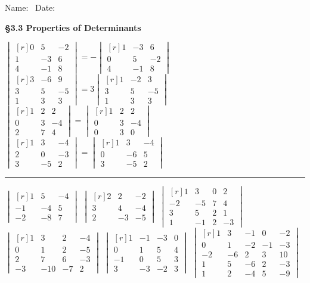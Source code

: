 \documentclass[11pt,answers]{exam} %
\newcommand{\dett}[1]{\begin{vmatrix*}[r] #1 \end{vmatrix*}}
\begin{document}
\flushleft
Name:\ \makebox[4in]{\hrulefill} \hspace{1in} Date:\ \makebox[1in]{\hrulefill}
\begin{center}
    \textbf{\S 3.3 Properties of Determinants}
\end{center}


\begin{questions}
    \question $\dett{0 & 5 & -2 \\ 1 & -3 & 6 \\ 4 & -1 & 8} = -\dett{1 & -3 & 6  \\ 0 & 5 & -2 \\ 4 & -1 & 8}$
    \question $\dett{3 & -6 & 9 \\ 3 & 5 & -5 \\ 1 & 3 & 3} = 3 \dett{1 & -2 & 3 \\ 3 & 5 & -5 \\ 1 & 3 & 3}$
    \question $\dett{1 & 2 & 2 \\ 0 & 3 & -4 \\2 & 7 & 4} = \dett{1 & 2 & 2 \\ 0 & 3 & -4 \\ 0 & 3 & 0}$
    \question $\dett{1 & 3 & -4 \\ 2 & 0 & -3 \\ 3 & -5 & 2} = \dett{1 & 3 & -4 \\ 0 & -6 & 5 \\ 3 & -5 & 2}$
    \begin{center}\rule{4in}{0.1mm}\end{center}
    \question $\dett{1 & 5 & -4 \\ -1 & -4 & 5 \\ -2 & -8 & 7}$
    \question $\dett{2 & 2 & -2 \\ 3 & 4 & -4 \\ 2 & -3 & -5}$
    \question $\dett{1 & 3 & 0 & 2 \\ -2 & -5 & 7 & 4 \\3 & 5 & 2 & 1 \\ 1 & -1 & 2 & -3}$
    \question $\dett{1 & 3 & 2 & -4 \\ 0 & 1 & 2 & -5 \\ 2 & 7 & 6 & -3 \\ -3 & -10 & -7 & 2}$
    \question $\dett{1 & -1 & -3 & 0 \\ 0 & 1 & 5 & 4 \\ -1 & 0 & 5 & 3 \\ 3 & -3 & -2 & 3}$
    \question $\dett{1 & 3 & -1 & 0 & -2 \\ 0 & 1 & -2 & -1 & -3 \\ -2 & -6 & 2 & 3 & 10 \\ 1 & 5 & -6 & 2 & -3 \\ 1 & 2 & -4 & 5 & -9}$


\end{questions}
\end{document}
